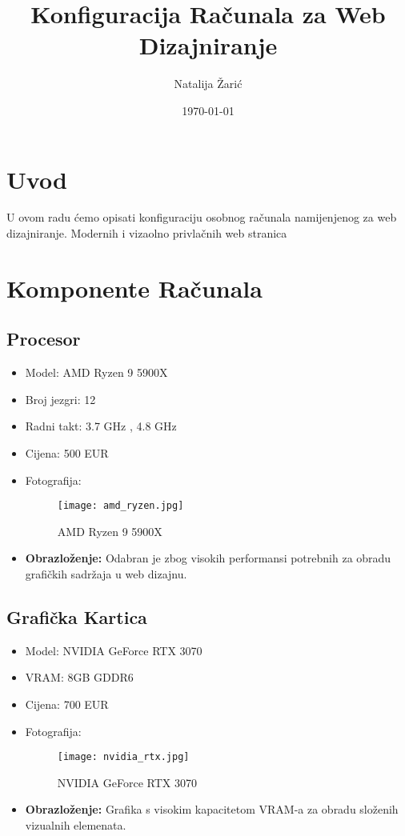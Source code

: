 \documentclass[30pt, letterpaper,utf8,a4paper]{article}
\title{Konfiguracija Računala za Web Dizajniranje}
\author{Natalija Žarić }
\date{\today}
\begin{document}
\maketitle
\newpage


\tableofcontents



\newpage


\section{Uvod}
U ovom radu ćemo opisati  konfiguraciju osobnog računala namijenjenog za web dizajniranje. Modernih i vizaolno privlačnih web stranica
\section{Komponente Računala}






\subsection{Procesor}
\begin{itemize}
    \item Model: AMD Ryzen 9 5900X
    \item Broj jezgri: 12
    \item Radni takt: 3.7 GHz , 4.8 GHz 
    \item Cijena: 500 EUR
    \item Fotografija: \begin{figure}[H]
        \centering
        \texttt{[image: amd\_ryzen.jpg]}
        \caption{AMD Ryzen 9 5900X}
    \end{figure}
    \item \textbf{Obrazloženje:} Odabran je zbog visokih performansi potrebnih za obradu grafičkih sadržaja u web dizajnu.
\end{itemize}

\subsection{Grafička Kartica}
\begin{itemize}
    \item Model: NVIDIA GeForce RTX 3070
    \item VRAM: 8GB GDDR6
    \item Cijena: 700 EUR
    \item Fotografija: \begin{figure}[H]
        \centering
        \texttt{[image: nvidia\_rtx.jpg]}
        \caption{NVIDIA GeForce RTX 3070}
    \end{figure}
    \item \textbf{Obrazloženje:} Grafika s visokim kapacitetom VRAM-a za obradu složenih vizualnih elemenata.
\end{itemize}
\end{document}
